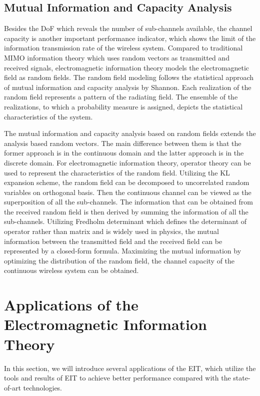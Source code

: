 \documentclass[journal,twocolumn]{IEEEtran}
\begin{document}
\subsection{Mutual Information and Capacity Analysis}
Besides the DoF which reveals the number of sub-channels available, the channel capacity is another important performance indicator, which shows the limit of the information transmission rate of the wireless system. Compared to traditional MIMO information theory which uses random vectors as transmitted and received signals, electromagnetic information theory models the electromagnetic field as random fields. The random field modeling follows the statistical approach of mutual information and capacity analysis by Shannon. Each realization of the random field represents a pattern of the radiating field. The ensemble of the realizations, to which a probability measure is assigned, depicts the statistical characteristics of the system. 

The mutual information and capacity analysis based on random fields extends the  analysis based random vectors. The main difference between them is that the former approach is in the continuous domain and the latter approach is in the discrete domain. For electromagnetic information theory, operator theory can be used to represent the characteristics of the random field. 
Utilizing the KL expansion scheme, the random field can be decomposed to uncorrelated random variables on orthogonal basis. Then the continuous channel can be viewed as the superposition of all the sub-channels. The information that can be obtained from the received random field is then derived by summing the information of all the sub-channels. Utilizing Fredholm determinant which defines the determinant of operator rather than matrix and is widely used in physics, the mutual information between the transmitted field and the received field can be represented by a closed-form formula. Maximizing the mutual information by optimizing the distribution of the random field, the channel capacity of the continuous wireless system can be obtained. 

\section{Applications of the Electromagnetic Information Theory}
In this section, we will introduce several applications of the EIT, which utilize the tools and results of EIT to achieve better performance compared with the state-of-art technologies.
\end{document}
